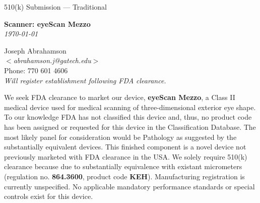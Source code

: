 \newpage
\singlespacing

\begin{flushright}
  \huge{510(k) Submission --- Traditional}\\[.5in]
  
  \begin{minipage}{0.8\textwidth}
    \begin{flushright}
      \large \textbf{Scanner: eyeScan Mezzo} \\
      \textit{\today}
    \end{flushright}
  \end{minipage}
\end{flushright}

\begin{flushleft}
  Joseph Abrahamson\\
  $<$\textit{abrahamson.j@gatech.edu}$>$ \\
  Phone: 770 601 4606 \\[1em]
  
  \textit{Will register establishment following FDA clearance.}
\end{flushleft}
\vspace{4em}

\onehalfspacing

We seek FDA clearance to market our device, \textbf{eyeScan Mezzo}, a
Class II medical device used for medical scanning of three-dimensional
exterior eye shape. To our knowledge FDA has not classified this
device and, thus, no product code has been assigned or requested for
this device in the Classification Database. The most likely panel for
consideration would be Pathology as suggested by the substantially
equivalent devices. This finished component is a novel device not
previously marketed with FDA clearance in the USA. We solely require
510(k) clearance because due to substantially equivalence with
existant micrometers (regulation no. \textbf{864.3600}, product code
\textbf{KEH}). Manufacturing registration is currently unspecified. No
applicable mandatory performance standards or special controls exist
for this device.

\newpage

